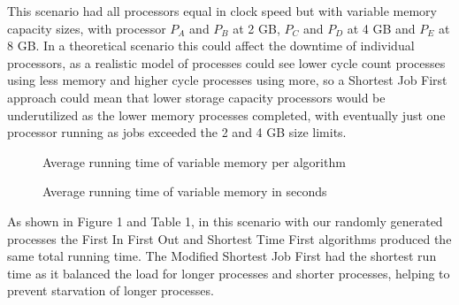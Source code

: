\documentclass[12pt]{article}
\begin{document}
  This scenario had all processors equal in clock speed but with variable memory capacity sizes, with processor $P_A$ and $P_B$ at 2 GB, $P_C$ and $P_D$ at 4 GB and $P_E$ at 8 GB. In a theoretical scenario this could affect the downtime of individual processors, as a realistic model of processes could see lower cycle count processes using less memory and higher cycle processes using more, so a Shortest Job First approach could mean that lower storage capacity processors would be underutilized as the lower memory processes completed, with eventually just one processor running as jobs exceeded the 2 and 4 GB size limits.

  \begin{figure}[h!]\CenterFloatBoxes
  \begin{floatrow}
    {\caption{Average running time of variable memory per algorithm}}
    \killfloatstyle{}
    {\caption{Average running time of variable memory in seconds}}
  \end{floatrow}
  \end{figure}

  As shown in Figure 1 and Table 1, in this scenario with our randomly generated processes the First In First Out and Shortest Time First algorithms produced the same total running time. The Modified Shortest Job First had the shortest run time as it balanced the load for longer processes and shorter processes, helping to prevent starvation of longer processes.
\end{document}
